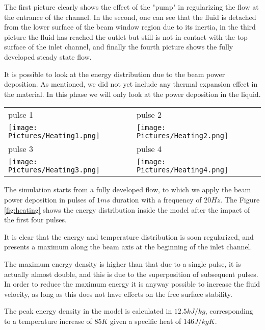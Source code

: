 \documentclass[a4paper, 11pt, twocolumn]{article}
\begin{document}
The first picture clearly shows the effect of the "pump" in regularizing the flow at the entrance of the channel. In the second, one can see that the fluid is detached from the lower surface of the beam window region due to its inertia, in the third picture the fluid has reached the outlet but still is not in contact with the top surface of the inlet channel, and finally the fourth picture shows the fully developed steady state flow.

It is possible to look at the energy distribution due to the beam power deposition. As mentioned, we did not yet include any thermal expansion effect in the material. In this phase we will only look at the power deposition in the liquid.

\begin{figure*}[t]
\centering
\begin{tabular}{|l|l|}
\hline
\small pulse 1 & \small pulse 2 \\
\texttt{[image: Pictures/Heating1.png]} &
\texttt{[image: Pictures/Heating2.png]} \\
\hline
\small pulse 3 & \small pulse 4 \\
\texttt{[image: Pictures/Heating3.png]} &
\texttt{[image: Pictures/Heating4.png]} \\
\hline
\end{tabular}
\caption{Target heating, a cutoff of the model is shown for clarity. The specific energy of $12.5 kJ/kg$ causes a temperature rise of $85 K$}
\label{fig:heating}
\end{figure*}

The simulation starts from a fully developed flow, to which we apply the beam power deposition in pulses of $1ms$ duration with a frequency of $20Hz$. The Figure \ref{fig:heating} shows the energy distribution inside the model after the impact of the first four pulses.

It is clear that the energy and temperature distribution is soon regularized, and presents a maximum along the beam axis at the beginning of the inlet channel.

The maximum energy density is higher than that due to a single pulse, it is actually almost double, and this is due to the superposition of subsequent pulses. In order to reduce the maximum energy it is anyway possible to increase the fluid velocity, as long as this does not have effects on the free surface stability.

The peak energy density in the model is calculated in $12.5 kJ/kg$, corresponding to a temperature increase of $85 K$ given a specific heat of $146 J/kgK$.
\end{document}
